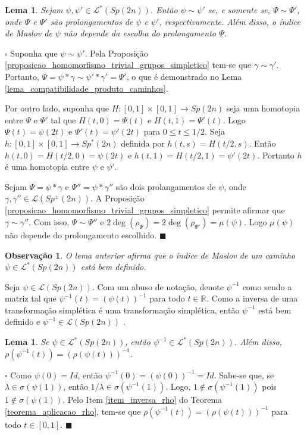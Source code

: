 \documentclass[12pt]{book}
\newtheorem{lema}[teorema]{Lema}
\newtheorem{observacao}[teorema]{Observação}
\newenvironment{prova}[1]{$\square$ #1}{\hfill$\blacksquare$}
\newcommand{\caminhos}{\mathcal{L}}
\newcommand{\dominioMaslov}{\caminhos^{*}(\gruposimpletico{2n})}
\newcommand{\espectrooperador}[1]{\sigma(#1)}
\newcommand{\gruposimpletico}[1]{Sp(#1)}
\newcommand{\gruposimpleticonaodegenerado}[1]{Sp^{#1}(2n)}
\newcommand{\intervalo}{[0,1]}
\newcommand{\real}[1]{\mathbb{R}^{#1}}
\newcommand{\reta}{\real{}}
\begin{document}
	\begin{lema}\label{lema_independencia_prolongamento}
		Sejam $\psi,\psi' \in  \dominioMaslov$. Então $\psi \sim \psi'$ se, e somente se, $\Psi \sim \Psi'$, onde $\Psi$ e $\Psi'$ são prolongamentos de $\psi$ e $\psi'$, respectivamente. Além disso, o índice de Maslov de $\psi$ não depende da escolha do prolongamento $\Psi$.
	\end{lema}
	\begin{prova}
		Suponha que $\psi \sim \psi'$. Pela Proposição \ref{proposicao_homomorfismo_trivial_grupos_simpletico} tem-se que $\gamma\sim \gamma'$. Portanto, $\Psi = \psi*\gamma \sim \psi'*\gamma' = \Psi'$, o que é demonstrado no Lema \ref{lema_compatibilidade_produto_caminhos}. 
		
		Por outro lado, suponha que $H: \intervalo \times \intervalo \to \gruposimpletico{2n}$ seja uma homotopia entre $\Psi $ e $\Psi'$ tal que $H(t,0) = \Psi(t)$ e $H(t,1) = \Psi'(t)$. Logo $\Psi(t) = \psi(2t)$ e $\Psi'(t) = \psi'(2t)$ para $0 \leq t \leq 1/2$. Seja $h: \intervalo \times \intervalo \to \gruposimpleticonaodegenerado{*}$ definida por $h(t,s) = H(t/2, s)$. Então  $h(t,0) = H(t/2, 0) =  \psi(2t)$ e $h(t,1)=H(t/2,1) = \psi'(2t)$. Portanto $h$ é uma homotopia entre $\psi$ e $\psi'$.
		
		Sejam $\Psi=\psi*\gamma$ e $\Psi''=\psi*\gamma''$ são dois prolangamentos de $\psi$, onde $\gamma, \gamma''\in \caminhos(\gruposimpleticonaodegenerado{\pm})$. A Proposição \ref{proposicao_homomorfismo_trivial_grupos_simpletico} permite afirmar que $\gamma\sim \gamma''$. Com isso, $\Psi\sim \Psi''$ e $2\deg(\rho_{\Psi})=2\deg(\rho_{\Psi'})=\mu(\psi)$. Logo $\mu(\psi)$ não depende do prolongamento escolhido.
	\end{prova}
	
	\begin{observacao}
		O lema anterior afirma que o índice de Maslov de um caminho $\psi\in \dominioMaslov$ está bem definido.
	\end{observacao}
	
	Seja $\psi\in \caminhos(\gruposimpletico{2n})$. Com um abuso de notação, denote $\psi^{-1}$ como sendo a matriz tal que $\psi^{-1}(t) = (\psi(t))^{-1}$ para todo $t\in \reta$. Como a inversa de uma transformação simplética é uma transformação simplética, então $\psi^{-1}$ está bem definido e $\psi^{-1} \in \caminhos(\gruposimpletico{2n})$ .
	
	\begin{lema}\label{lema_inversa_caminho_especial}
		Se $\psi \in   \dominioMaslov$, então $\psi^{-1} \in  \dominioMaslov$. Além disso, $\rho(\psi^{-1}(t)) = (\rho(\psi(t)))^{-1}$.
	\end{lema}
	\begin{prova}
		Como $\psi(0) = Id$, então $\psi^{-1}(0) = (\psi(0))^{-1} = Id$. Sabe-se que, se $\lambda\in \espectrooperador{\psi(1)}$, então $1/\lambda\in \espectrooperador{\psi^{-1}(1)}$. Logo, $1\notin \espectrooperador{\psi^{-1}(1)}$ pois $1\notin \espectrooperador{\psi(1)}$. Pelo Item \ref{item_inversa_rho} do Teorema \ref{teorema_aplicacao_rho}, tem-se que $\rho(\psi^{-1}(t))= (\rho(\psi(t)))^{-1}$ para todo $t\in \intervalo$.
	\end{prova}
	
\end{document}
